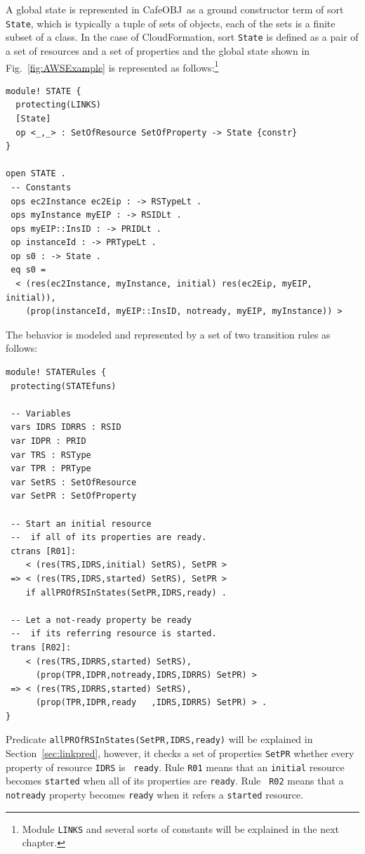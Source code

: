 \documentclass[12pt]{report}
\newcommand{\stt}[1]{{\small{\tt {#1}}}}
\newcommand{\cafeobj}{{\sf CafeOBJ}~}
\begin{document}
A global state is represented in \cafeobj as a ground constructor term
of sort {\tt State}, which is typically a tuple of sets of objects,
each of the sets is a finite subset of a class.  In the case of
CloudFormation, sort {\tt State} is defined as a pair of a set of
resources and a set of properties and the global state shown in
Fig.~\ref{fig:AWSExample} is represented as follows:\footnote{Module
  {\tt LINKS} and several sorts of constants will be explained in the
  next chapter.}
\begin{verbatim}
module! STATE {
  protecting(LINKS)
  [State]
  op <_,_> : SetOfResource SetOfProperty -> State {constr}
}

open STATE . 
 -- Constants
 ops ec2Instance ec2Eip : -> RSTypeLt .
 ops myInstance myEIP : -> RSIDLt .
 ops myEIP::InsID : -> PRIDLt .
 op instanceId : -> PRTypeLt .
 op s0 : -> State .
 eq s0 =
  < (res(ec2Instance, myInstance, initial) res(ec2Eip, myEIP, initial)),
    (prop(instanceId, myEIP::InsID, notready, myEIP, myInstance)) >
\end{verbatim}
The behavior is modeled and represented by a set of two transition
rules as follows:
\begin{verbatim}
module! STATERules {
 protecting(STATEfuns)

 -- Variables
 vars IDRS IDRRS : RSID 
 var IDPR : PRID
 var TRS : RSType
 var TPR : PRType
 var SetRS : SetOfResource
 var SetPR : SetOfProperty

 -- Start an initial resource
 --  if all of its properties are ready.
 ctrans [R01]:
    < (res(TRS,IDRS,initial) SetRS), SetPR >
 => < (res(TRS,IDRS,started) SetRS), SetPR > 
    if allPROfRSInStates(SetPR,IDRS,ready) .

 -- Let a not-ready property be ready 
 --  if its referring resource is started.
 trans [R02]:
    < (res(TRS,IDRRS,started) SetRS), 
      (prop(TPR,IDPR,notready,IDRS,IDRRS) SetPR) >
 => < (res(TRS,IDRRS,started) SetRS), 
      (prop(TPR,IDPR,ready   ,IDRS,IDRRS) SetPR) > .
}
\end{verbatim}
Predicate \stt{allPROfRSInStates(SetPR,IDRS,ready)} will be explained
in Section~\ref{sec:linkpred}, however, it checks a set of properties
{\tt SetPR} whether every property of resource {\tt IDRS} is {\tt
  ready}.  Rule {\tt R01} means that an {\tt initial} resource becomes
{\tt started} when all of its properties are {\tt ready}.  Rule {\tt
  R02} means that a {\tt notready} property becomes {\tt ready} when
it refers a {\tt started} resource.

\end{document}
